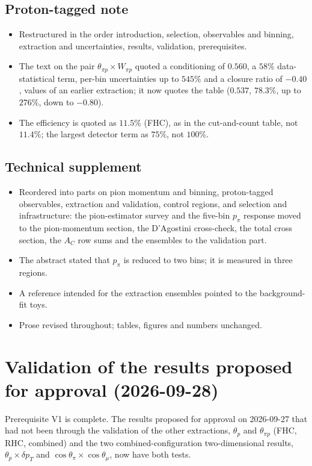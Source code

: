 \subsection{Proton-tagged note}
\begin{itemize}\itemsep1pt
  \item Restructured in the order introduction, selection, observables and binning, extraction and
    uncertainties, results, validation, prerequisites.
  \item The text on the pair $\theta_{\pi p}\times W_{\pi p}$ quoted a conditioning of $0.560$, a
    $58\%$ data-statistical term, per-bin uncertainties up to $545\%$ and a closure ratio of $-0.40$,
    values of an earlier extraction; it now quotes the table ($0.537$, $78.3\%$, up to $276\%$, down
    to $-0.80$).
  \item The efficiency is quoted as $11.5\%$ (FHC), as in the cut-and-count table, not $11.4\%$; the
    largest detector term as $75\%$, not $100\%$.
\end{itemize}

\subsection{Technical supplement}
\begin{itemize}\itemsep1pt
  \item Reordered into parts on pion momentum and binning, proton-tagged observables, extraction and
    validation, control regions, and selection and infrastructure: the pion-estimator survey and the
    five-bin $p_\pi$ response moved to the pion-momentum section, the D'Agostini cross-check, the total
    cross section, the $A_C$ row sums and the ensembles to the validation part.
  \item The abstract stated that $p_\pi$ is reduced to two bins; it is measured in three regions.
  \item A reference intended for the extraction ensembles pointed to the background-fit toys.
  \item Prose revised throughout; tables, figures and numbers unchanged.
\end{itemize}

\section{Validation of the results proposed for approval (2026-09-28)}

Prerequisite V1 is complete. The results proposed for approval on 2026-09-27 that had not been through
the validation of the other extractions, $\theta_p$ and $\theta_{\pi p}$ (FHC, RHC, combined) and the
two combined-configuration two-dimensional results, $\theta_p\times\delta p_T$ and
$\cos\theta_\pi\times\cos\theta_\mu$, now have both tests.

